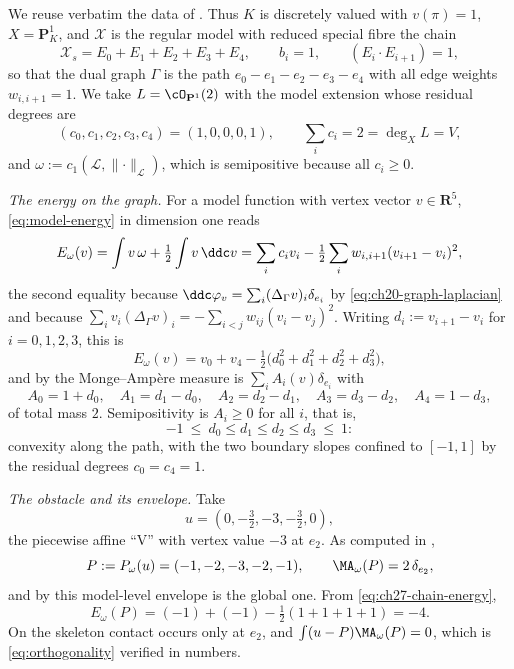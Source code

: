 \begin{example}
\label{ex:ch27-curve-derivative}
We reuse verbatim the data of .  Thus
$K$ is discretely valued with $v(\pi)=1$, $X=\mathbf P^1_K$, and
$\mathcal X$ is the regular model with reduced special fibre the chain
\[
 \mathcal X_s=E_0+E_1+E_2+E_3+E_4,
 \qquad b_i=1,\qquad (E_i\cdot E_{i+1})=1,
\]
so that the dual graph $\Gamma$ is the path
$e_0-e_1-e_2-e_3-e_4$ with all edge weights $w_{i,i+1}=1$.  We take
$L=\cO_{\mathbf P^1}(2)$ with the model extension whose residual degrees
are
\[
 (c_0,c_1,c_2,c_3,c_4)=(1,0,0,0,1),
 \qquad \sum_ic_i=2=\deg_XL=V,
\]
and $\omega:=c_1(\mathcal L,\lVert\cdot\rVert_{\mathcal L})$, which is
semipositive because all $c_i\geq0$.

\emph{The energy on the graph.}  For a model function with vertex vector
$v\in\mathbf R^5$, \eqref{eq:model-energy} in dimension one reads
\[
 E_\omega(v)=\int v\,\omega+\tfrac12\int v\,\ddc v
 =\sum_ic_iv_i-\tfrac12\sum_{i}w_{i,i+1}(v_{i+1}-v_i)^2 ,
\]
the second equality because
$\ddc\varphi_v=\sum_i(\Delta_\Gamma v)_i\delta_{e_i}$ by
\eqref{eq:ch20-graph-laplacian} and because
$\sum_iv_i(\Delta_\Gamma v)_i=-\sum_{i<j}w_{ij}(v_i-v_j)^2$.  Writing
$d_i:=v_{i+1}-v_i$ for $i=0,1,2,3$, this is
\begin{equation}\label{eq:ch27-chain-energy}
 E_\omega(v)=v_0+v_4-\tfrac12\bigl(d_0^2+d_1^2+d_2^2+d_3^2\bigr),
\end{equation}
and by  the Monge--Amp\`ere measure is
$\sum_iA_i(v)\delta_{e_i}$ with
\begin{equation}\label{eq:ch27-chain-A}
 A_0=1+d_0,\quad A_1=d_1-d_0,\quad A_2=d_2-d_1,\quad A_3=d_3-d_2,
 \quad A_4=1-d_3,
\end{equation}
of total mass $2$.  Semipositivity is $A_i\geq0$ for all $i$, that is,
\begin{equation}\label{eq:ch27-chain-slope-window}
 -1\ \leq\ d_0\leq d_1\leq d_2\leq d_3\ \leq\ 1 :
\end{equation}
convexity along the path, with the two boundary slopes confined to
$[-1,1]$ by the residual degrees $c_0=c_4=1$.

\emph{The obstacle and its envelope.}  Take
\[
 u=(0,-\tfrac32,-3,-\tfrac32,0),
\]
the piecewise affine ``V'' with vertex value $-3$ at $e_2$.  As computed
in ,
\[
 P:=P_\omega(u)=(-1,-2,-3,-2,-1),
 \qquad
 \MA_\omega(P)=2\,\delta_{e_2},
\]
and by  this model-level envelope is the
global one.  From \eqref{eq:ch27-chain-energy},
\[
 E_\omega(P)=(-1)+(-1)-\tfrac12(1+1+1+1)=-4 .
\]
On the skeleton contact occurs only at $e_2$, and $\int(u-P)\MA_\omega(P)=0$, which is
\eqref{eq:orthogonality} verified in numbers.


\end{example}
